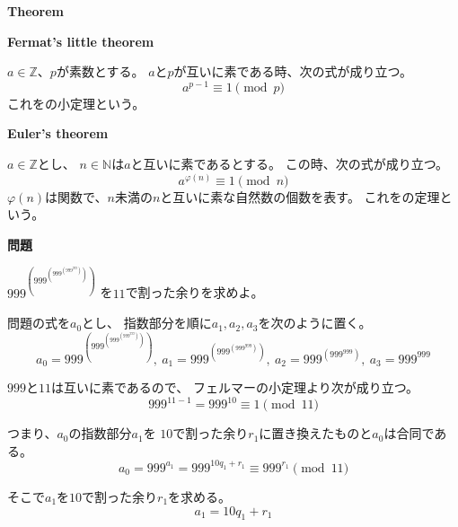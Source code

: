 \documentclass[12pt,b5paper]{ltjsarticle}
\begin{document}
\hrulefill
\textbf{Theorem}
\hrulefill

\textbf{Fermat's little theorem}

$a \in\mathbb{Z}$、$p$が素数とする。
$a$と$p$が互いに素である時、次の式が成り立つ。
\begin{equation}
 a^{p-1}\equiv 1 \pmod{p}
\end{equation}
これをの小定理という。


\textbf{Euler's theorem}

$a\in\mathbb{Z}$とし、
$n\in\mathbb{N}$は$a$と互いに素であるとする。
この時、次の式が成り立つ。
\begin{equation}
 a^{\varphi(n)}\equiv 1 \pmod{n}
\end{equation}
$\varphi(n)$は関数で、$n$未満の$n$と互いに素な自然数の個数を表す。
これをの定理という。


\hrulefill
\textbf{問題}
\hrulefill


$999^{\left( 999^{\left( 999^{\left( 999^{999} \right)} \right)} \right)}$
を$11$で割った余りを求めよ。

\dotfill

問題の式を$a_0$とし、
指数部分を順に$a_1,a_2,a_3$を次のように置く。
\begin{equation}
 a_0 = 999^{\left( 999^{\left( 999^{\left( 999^{999} \right)} \right)} \right)},\
  a_1 = 999^{\left( 999^{\left( 999^{999} \right)} \right)},\
  a_2 = 999^{\left( 999^{999} \right)},\
  a_3 = 999^{999}
\end{equation}

$999$と$11$は互いに素であるので、
フェルマーの小定理より次が成り立つ。
\begin{equation}
 999^{11-1} = 999^{10} \equiv 1 \pmod{11}
  \label{fermat}
\end{equation}

つまり、$a_{0}$の指数部分$a_{1}$を
$10$で割った余り$r_{1}$に置き換えたものと$a_{0}$は合同である。
\begin{equation}
 a_0 = 999^{a_1}= 999^{10q_{1}+r_{1}} \equiv 999^{r_{1}} \pmod{11}
\end{equation}

そこで$a_1$を$10$で割った余り$r_{1}$を求める。
\begin{equation}
 a_1=10q_{1}+r_{1}
  \label{exp1}
\end{equation}
\end{document}
